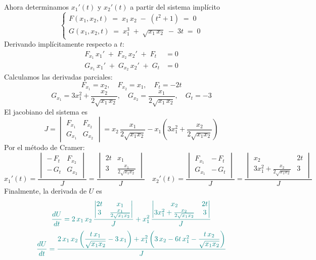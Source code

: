 \documentclass{article}
\begin{document}
Ahora determinamos \(x_1'(t)\) y \(x_2'(t)\) a partir del sistema implícito
\[
\begin{cases}
F(x_1,x_2,t)\;=\;x_1\,x_2 \;-\;(t^2+1)\;=\;0\\[6pt]
G(x_1,x_2,t)\;=\;x_1^3 \;+\;\sqrt{x_1\,x_2}\;-\;3t\;=\;0
\end{cases}
\]
Derivando implícitamente respecto a \(t\):
\[
\begin{aligned}
F_{x_1}\,x_1' \;+\;F_{x_2}\,x_2' \;+\;F_t &= 0\\
G_{x_1}\,x_1' \;+\;G_{x_2}\,x_2' \;+\;G_t &= 0
\end{aligned}
\]
Calculamos las derivadas parciales:
\[
F_{x_1}=x_2,\quad F_{x_2}=x_1,\quad F_t = -2t
\]
\[
G_{x_1}=3x_1^2 + \frac{x_2}{2\sqrt{x_1\,x_2}},
\quad
G_{x_2}=\frac{x_1}{2\sqrt{x_1\,x_2}},
\quad
G_t = -3
\]
El jacobiano del sistema es
\[
J =
\begin{vmatrix}
F_{x_1} & F_{x_2}\\[3pt]
G_{x_1} & G_{x_2}
\end{vmatrix}
=
x_2\,\frac{x_1}{2\sqrt{x_1x_2}}
-
x_1\left(3x_1^2 + \frac{x_2}{2\sqrt{x_1x_2}}\right)
\]
Por el método de Cramer:
\[
x_1'(t)
=
\frac{
\begin{vmatrix}
-\,F_t & F_{x_2}\\[3pt]
-\,G_t & G_{x_2}
\end{vmatrix}
}{J}
=
\frac{
\begin{vmatrix}
2t & x_1\\[3pt]
3 & \tfrac{x_1}{2\sqrt{x_1x_2}}
\end{vmatrix}
}{J}
\quad
x_2'(t)
=
\frac{
\begin{vmatrix}
F_{x_1} & -\,F_t\\[3pt]
G_{x_1} & -\,G_t
\end{vmatrix}
}{J}
=
\frac{
\begin{vmatrix}
x_2 & 2t\\[3pt]
3x_1^2 + \tfrac{x_2}{2\sqrt{x_1x_2}} & 3
\end{vmatrix}
}{J}
\]
Finalmente, la derivada de \(U\) es
\[ \color{teal}
\frac{dU}{dt}
=2\,x_1\,x_2\,\frac{
\begin{vmatrix}
2t & x_1\\
3 & \tfrac{x_1}{2\sqrt{x_1x_2}}
\end{vmatrix}
}{J}
+
x_1^2\,\frac{
\begin{vmatrix}
x_2 & 2t\\
3x_1^2 + \tfrac{x_2}{2\sqrt{x_1x_2}} & 3
\end{vmatrix}
}{J}
\]
\[\color{teal}
\frac{dU}{dt}
=\frac{2\,x_1\,x_2\left(\dfrac{t\,x_1}{\sqrt{x_1x_2}}-3\,x_1\right)
+
x_1^2\left(3\,x_2-6t\,x_1^2-\dfrac{t\,x_2}{\sqrt{x_1x_2}}\right)}{J}
\]
\end{document}
